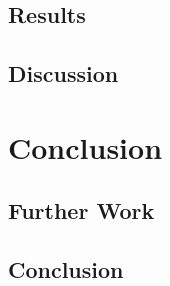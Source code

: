 \documentclass[bsc,frontabs,twoside,singlespacing,parskip,deptreport]{infthesis}     %
\begin{document}
\section{Results}
\section{Discussion}
\chapter{Conclusion}
\section{Further Work}
\section{Conclusion}


\end{document}
